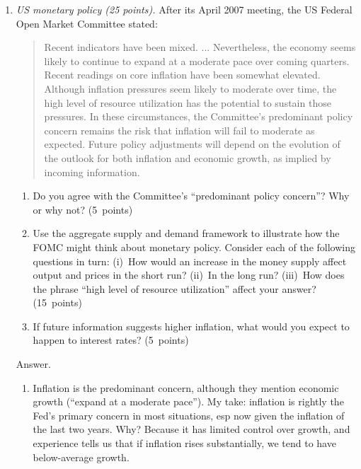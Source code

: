 \documentclass[letterpaper,12pt]{article}
\begin{document}
\begin{enumerate}
\item {\it US monetary policy (25 points).}
After its April 2007 meeting,
the US Federal Open Market Committee stated:
%
\begin{quote}
Recent indicators have been mixed. ...
Nevertheless, the economy seems likely to continue
to expand at a moderate pace over coming quarters.
%
Recent readings on core inflation have been somewhat elevated.
Although inflation pressures seem likely to moderate over time,
the high level of resource utilization has the potential
to sustain those pressures.
%
In these circumstances, the Committee's predominant policy concern remains the risk that inflation will fail to moderate as expected. Future policy adjustments will depend on the evolution of the outlook for both inflation and economic growth, as implied by incoming information.
\end{quote}
%
\begin{enumerate}
\item Do you agree with  the Committee's ``predominant policy concern''?
Why or why not?
(5~points)
\item Use the aggregate supply and demand framework
to illustrate how the FOMC might think about monetary policy.
Consider each of the following questions in turn:
(i)~How would an increase in the money supply affect
output and prices in the short run?
(ii)~In the long run?
(iii)~How does the phrase ``high level of resource utilization''
affect your answer?
(15~points)
\item If future information suggests higher inflation,
what would you expect to happen to interest rates?
(5~points)
\end{enumerate}

Answer.
\begin{enumerate}
\item Inflation is the predominant concern,
although they  mention economic growth
(``expand at a moderate pace'').
My take:  inflation is rightly the Fed's primary concern in most
situations, esp now given the inflation of the last two years. Why?
Because it has limited control over growth, and experience tells us
that if inflation rises substantially, we tend to have below-average
growth.


\end{enumerate}
\end{enumerate}
\end{document}
